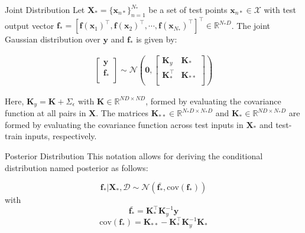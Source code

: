 \documentclass[10pt, xcolor=table]{beamer}
\begin{document}
\begin{frame}{Joint Distribution}
	Let $\mathbf{X}_* = \{\bm{x}_{n*}\}_{n=1}^{N_*}$ be a set of test points $\bm{x}_{n*} \in \mathcal{X}$ with test output vector $\mathbf{f}_* = [\bm{f}(\bm{x}_1)^\top, \bm{f}(\bm{x}_2)^\top, \cdots, \bm{f}(\bm{x}_{N_*})^\top]^\top \in \mathbb{R}^{N_* D}$. The joint Gaussian distribution over $\mathbf{y}$ and $\mathbf{f}_*$ is given by:
	
	\begin{equation}\label{sogp_prior_matrix}
	\begin{array}{rcl}
	\left[ \begin{array}{c}
	\mathbf{y}\\
	\mathbf{f_*}\\
	\end{array}
	\right]
	\sim
	\mathcal{N} \left(
	\bm{0},
	\left[ \begin{array}{cc}
	\mathbf{K}_y & \mathbf{K}_*\\
	\mathbf{K}_*^\top & \mathbf{K}_{**}\\
	\end{array}
	\right] \right)
	\end{array}
	\end{equation}
	
	Here, $\mathbf{K}_y=\mathbf{K} + \Sigma_\epsilon$ with $\mathbf{K} \in \mathbb{R}^{ND \times ND}$, formed by evaluating the covariance function at all pairs in $\mathbf{X}$. The matrices $\mathbf{K}_{**} \in \mathbb{R}^{N_*D \times N_*D}$ and $\mathbf{K}_{*} \in \mathbb{R}^{ND \times N_*D}$ are formed by evaluating the covariance function across test inputs in $\mathbf{X}_*$ and test-train inputs, respectively.
\end{frame}

\begin{frame}{Posterior Distribution}
	This notation allows for deriving the conditional distribution named posterior as follows:
	
	\begin{equation}\label{sogp_posterior}
	\mathbf{f}_*|\mathbf{X}_*, \mathcal{D} \sim \mathcal{N}(\bar{\mathbf{f}_*},\text{cov}(\mathbf{f}_*))
	\end{equation}
	with
	\begin{equation}\label{sogp_posterior_mean}
	\bar{\mathbf{f}_*} = \mathbf{K}_*^\top \mathbf{K}_y^{-1} \mathbf{y}
	\end{equation}
	\begin{equation}\label{sogp_posterior_cov}
	\text{cov}(\mathbf{f}_*) = \mathbf{K}_{**} -  \mathbf{K}_*^\top \mathbf{K}_y^{-1} \mathbf{K}_*
	\end{equation}
\end{frame}
\end{document}
